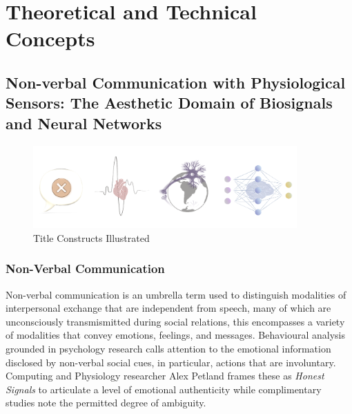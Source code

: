 

\chapter{Theoretical and Technical Concepts}
\label{cha:technical_concepts}

\section{Non-verbal Communication with Physiological Sensors: The Aesthetic Domain of Biosignals and Neural Networks}
\label{subsec:title}

\begin{figure}[htbp]
	\centering
	\includegraphics[width=0.9\textwidth]{Chapters/Figures/background/sec2_title_constructs_alpha.png}
	\caption{Title Constructs Illustrated}
	\label{fig:Title_Constructs}
\end{figure}


\subsection{Non-Verbal Communication}

Non-verbal communication is an umbrella term used to distinguish modalities of interpersonal exchange that are independent from speech, many of which are unconsciously transmismitted during social relations, this encompasses a variety of modalities that convey emotions, feelings, and messages. Behavioural analysis grounded in psychology research calls attention to the emotional information disclosed by non-verbal social cues, in particular, actions that are involuntary. Computing and Physiology researcher Alex Petland frames these as \textit{Honest Signals} to articulate a level of emotional authenticity while complimentary studies note the permitted degree of ambiguity.

